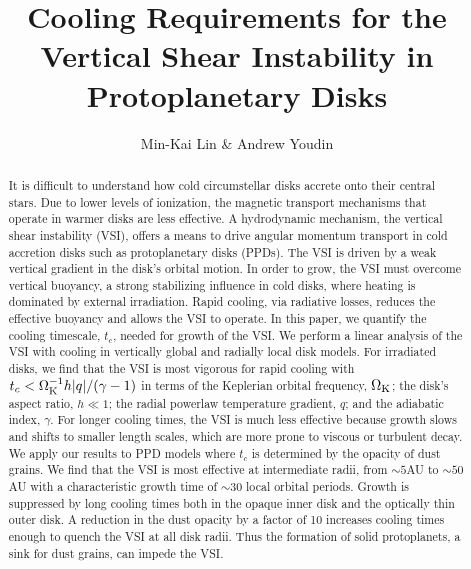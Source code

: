 \documentclass[iop, numberedappendix]{emulateapj}
\def \OmK {\Omega_{\rm K}}
\begin{document}
\title{Cooling Requirements for the Vertical Shear Instability 
  in Protoplanetary Disks}
\author{Min-Kai Lin \& Andrew Youdin}

\begin{abstract}
  It is difficult to understand how cold circumstellar disks accrete onto their central stars.  Due to 
  lower levels of ionization, the magnetic transport mechanisms that
  operate in warmer disks are less effective.  
  A hydrodynamic mechanism, the vertical shear instability (VSI), offers a means to drive angular momentum 
  transport in cold accretion disks such as protoplanetary disks (PPDs).  
  The VSI is driven by a weak vertical gradient in the disk's orbital motion.
  In order to grow, the VSI must overcome vertical buoyancy, a strong
  stabilizing influence in cold disks, where  
  heating is dominated by external irradiation.  Rapid cooling, via
  radiative losses, reduces the effective buoyancy 
  and allows the VSI to operate.  In this paper, we quantify the
  cooling timescale, $t_c$, needed for growth of the VSI.
   We perform a linear analysis of the VSI with cooling in
  vertically global and radially local disk models. 
  For irradiated disks, we find that the VSI is most vigorous for
  rapid cooling with $t_c < \OmK^{-1}  h |q| / (\gamma -1)$ 
  in terms of the Keplerian orbital frequency, $\OmK$; the disk's
  aspect ratio, $ h \ll 1$; the radial  
  powerlaw temperature gradient, $q$; and the adiabatic index,
  $\gamma$.  For longer cooling times, the VSI  
  is much less effective because growth slows and shifts to smaller length scales, which are more prone to 
  viscous or turbulent decay.  We apply our results to PPD models 
  where $t_c$ is determined by the opacity of dust grains.  We
  find that the VSI is most effective at intermediate radii, from $\sim 5$AU to $\sim 50$AU with a
  characteristic growth time of $\sim 30$ local orbital periods.
  Growth is suppressed by long cooling times both in the opaque  
  inner disk and the optically thin outer disk.  A reduction in the
  dust opacity by a factor of 10 increases cooling times  
  enough to quench the VSI at all disk radii.  Thus the formation of
  solid protoplanets, a sink for dust grains, can impede the VSI. 
\end{abstract}
\end{document}

